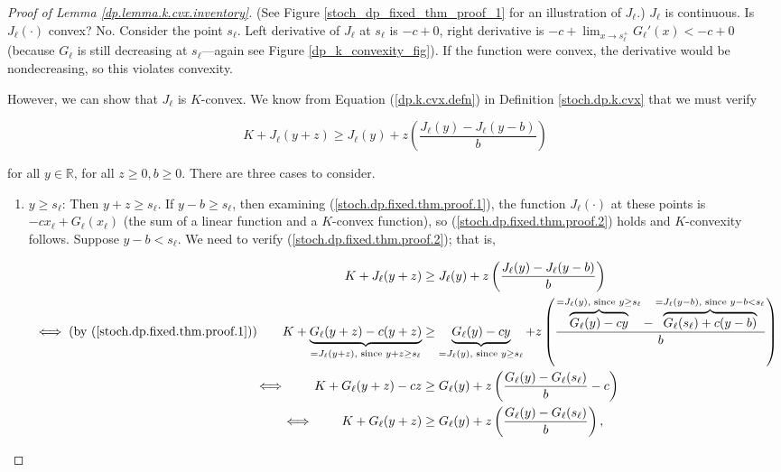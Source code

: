 \begin{proof}[Proof of Lemma \ref{dp.lemma.k.cvx.inventory}]
(See Figure \ref{stoch_dp_fixed_thm_proof_1} for an illustration of \(J_\ell\).) \(J_{\ell}\) is continuous. Is \(J_\ell(\cdot)\) convex? No. Consider the point \(s_\ell\). Left derivative of \(J_\ell\) at \(s_\ell\) is \(-c + 0\), right derivative is \(-c + \lim_{x \to s_\ell^+} G_\ell'(x) < -c + 0\) (because \(G_\ell\) is still decreasing at \(s_\ell\)---again see Figure \ref{dp_k_convexity_fig}). If the function were convex, the derivative would be nondecreasing, so this violates convexity. 




However, we can show that \(J_{\ell}\) is \(K\)-convex. We know from Equation (\ref{dp.k.cvx.defn}) in Definition \ref{stoch.dp.k.cvx} that we must verify



\begin{equation}\label{stoch.dp.fixed.thm.proof.2}
K + J_\ell(y+z) \geq J_\ell(y) + z \left( \frac{J_\ell(y) - J_\ell(y- b)}{b} \right)
\end{equation}

for all \(y \in \mathbb{R}\), for all \(z \geq 0, b \geq 0\). There are three cases to consider.

\begin{enumerate}

\item \(y \geq s_\ell\): Then \(y + z \geq s_\ell\). If \(y - b \geq s_\ell\), then examining (\ref{stoch.dp.fixed.thm.proof.1}), the function \(J_\ell(\cdot)\) at these points is \(-c x_\ell + G_\ell(x_\ell)\) (the sum of a linear function and a \(K\)-convex function), so (\ref{stoch.dp.fixed.thm.proof.2}) holds and \(K\)-convexity follows. Suppose \(y - b < s_\ell\). We need to verify (\ref{stoch.dp.fixed.thm.proof.2}); that is,

\begin{align}
K + J_\ell(y+z)  & \geq J_\ell(y) + z \left( \frac{J_\ell(y) - J_\ell(y- b)}{b} \right) \nonumber \\
\iff \text{(by (\ref{stoch.dp.fixed.thm.proof.1}))} \qquad K + \underbrace{G_\ell(y+z) - c(y +z)}_{= J_\ell(y +z), \text{ since } y + z \geq s_\ell} & \geq \underbrace{G_\ell(y)  - cy}_{= J_\ell(y ), \text{ since } y  \geq s_\ell}  + z \left( \frac{\overbrace{G_\ell(y) - cy}^{= J_\ell(y ), \text{ since } y  \geq s_\ell} - \overbrace{G_\ell(s_\ell) + c(y-b)}^{= J_\ell(y - b ), \text{ since } y - b  < s_\ell}}{b} \right) \nonumber \\
 \iff \qquad K + G_\ell(y+z) - cz & \geq G_\ell(y) +  z \left( \frac{G_\ell(y) - G_\ell(s_\ell)}{b} - c \right) \nonumber \\
\iff \qquad K + G_\ell(y+z) & \geq G_\ell(y) +  z \left( \frac{G_\ell(y) - G_\ell(s_\ell)}{b} \right), \label{stoch.dp.fixed.thm.proof.3}
\end{align}


\end{enumerate}
\end{proof}
